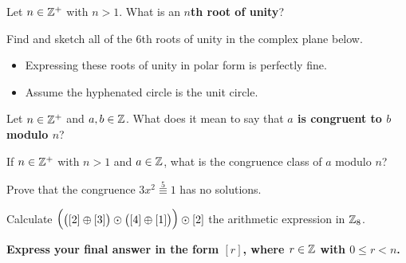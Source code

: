 \documentclass[11pt]{exam}
\begin{document}
\begin{questions}

\setlength\answerskip{0pt}

\addpoints

\question Let $n\in\mathbb{Z}^{+}$ with $n > 1$.  What is an \textbf{$n$th root of unity}?
\vspace{3cm}

\question Find and sketch all of the $6$th roots of unity in the complex plane below.  
\begin{itemize}
\item Expressing these roots of unity in polar form is perfectly fine.
\item Assume the hyphenated circle is the unit circle.
\end{itemize}
\vfill

\begin{center}
\end{center}
\newpage

\question Let $n\in\mathbb{Z}^{+}$ and $a,b\in\mathbb{Z}$.  What does it mean to say that \textbf{$a$ is congruent to $b$ modulo $n$}?
\vspace{3cm}

\question If $n\in\mathbb{Z}^{+}$ with $n > 1$ and $a\in\mathbb{Z}$, what is the congruence class of $a$ modulo $n$?
\vspace{3cm}

\question Prove that the congruence $3x^2\overset{5}{\equiv} 1$ has no solutions.
\vfill

\question Calculate ${\Large\big(} \big( [2]\oplus [3]\big)\odot \big([4]\oplus [1]\big){\Large\big)}\odot [2]$ the arithmetic expression in $\mathbb{Z}_8$.

\textbf{Express your final answer in the form $[r]$, where $r\in\mathbb{Z}$ with $0\leq r < n$.}

\vfill


\end{questions}
\end{document}
